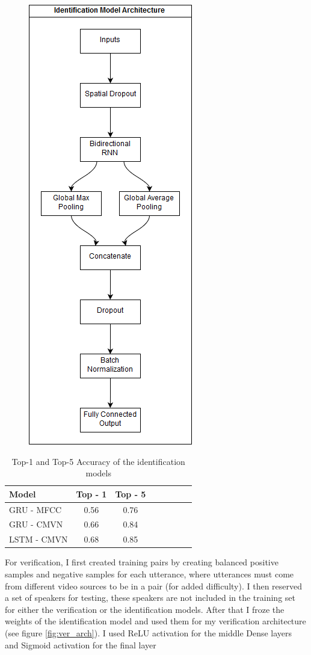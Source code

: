\documentclass{article}
\begin{document}
\begin{figure}[H]
    \centering
    \includegraphics[scale=.65]{images/id_model.png}
    \label{fig:id_arch}
\end{figure}
\begin{table}[H]
    \centering
    \begin{tabular}{l*{6}{c}r}
        Model & Top - 1 & Top - 5\\
        \hline
        GRU - MFCC & 0.56 & 0.76  \\
        GRU - CMVN & 0.66 & 0.84  \\
        LSTM - CMVN & 0.68 & 0.85  \\
    \end{tabular}
    \caption{Top-1 and Top-5 Accuracy of the identification models}
    \label{tab:id_results}
\end{table}
For verification, I first created training pairs by creating balanced positive samples and negative samples for each utterance, where utterances must come from different video sources to be in a pair (for added difficulty). I then reserved a set of speakers for testing, these speakers are not included in the training set for either the verification or the identification models.
After that I froze the weights of the identification model and used them for my verification architecture (see figure \ref{fig:ver_arch}).
I used ReLU activation for the middle Dense layers and Sigmoid activation for the final layer
\end{document}
